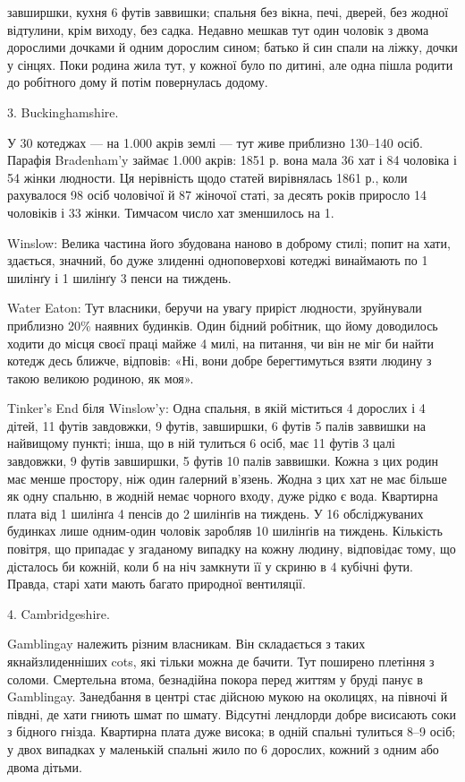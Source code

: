 \parcont{}  %
завширшки, кухня 6 футів заввишки; спальня без вікна, печі,
дверей, без жодної відтулини, крім виходу, без садка. Недавно
мешкав тут один чоловік з двома дорослими дочками й одним
дорослим сином; батько й син спали на ліжку, дочки у сінцях.
Поки родина жила тут, у кожної було по дитині, але одна пішла
родити до робітного дому й потім повернулась додому.

3. Buckinghamshire.

У 30 котеджах — на \num{1.000} акрів землі — тут живе приблизно
130--140 осіб. Парафія Bradenham’y займає \num{1.000} акрів: 1851 р.
вона мала 36 хат і 84 чоловіка і 54 жінки людности. Ця нерівність
щодо статей вирівнялась 1861 р., коли рахувалося 98 осіб
чоловічої й 87 жіночої статі, за десять років приросло 14 чоловіків
і 33 жінки. Тимчасом число хат зменшилось на 1.

Winslow: Велика частина його збудована наново в доброму
стилі; попит на хати, здається, значний, бо дуже злиденні одноповерхові
котеджі винаймають по 1 шилінґу і 1 шилінґу 3 пенси
на тиждень.

Water Eaton: Тут власники, беручи на увагу приріст людности,
зруйнували приблизно 20\% наявних будинків. Один бідний
робітник, що йому доводилось ходити до місця своєї праці
майже 4 милі, на питання, чи він не міг би найти котедж десь
ближче, відповів: «Ні, вони добре берегтимуться взяти людину
з  такою великою родиною, як моя».

Tinker’s End біля Winslow’y: Одна спальня, в якій міститься
4 дорослих і 4 дітей, 11 футів завдовжки, 9 футів, завширшки,
6 футів 5 палів заввишки на найвищому пункті; інша, що в ній
тулиться 6 осіб, має 11 футів 3 цалі завдовжки, 9 футів завширшки,
5 футів 10 палів заввишки. Кожна з цих родин має менше
простору, ніж один ґалерний в’язень. Жодна з цих хат не має
більше як одну спальню, в жодній немає чорного входу, дуже
рідко є вода. Квартирна плата від 1 шилінґа 4 пенсів до 2 шилінґів
на тиждень. У 16 обсліджуваних будинках лише одним-один
чоловік заробляв 10 шилінґів на тиждень. Кількість повітря, що
припадає у згаданому випадку на кожну людину, відповідає
тому, що дісталось би кожній, коли б на ніч замкнути її у скриню
в 4 кубічні фути. Правда, старі хати мають багато природної
вентиляції.

4. Cambridgeshire.

Gamblingay належить різним власникам. Він складається з
таких якнайзлиденніших cots, які тільки можна де бачити.
Тут поширено плетіння з соломи. Смертельна втома, безнадійна
покора перед життям у бруді панує в Gamblingay. Занедбання
в центрі стає дійсною мукою на околицях, на півночі й півдні, де
хати гниють шмат по шмату. Відсутні лендлорди добре висисають
соки з бідного гнізда. Квартирна плата дуже висока;
в одній спальні тулиться 8--9 осіб; у двох випадках у маленькій
спальні жило по 6 дорослих, кожний з одним або двома дітьми.
\parbreak{}  %
